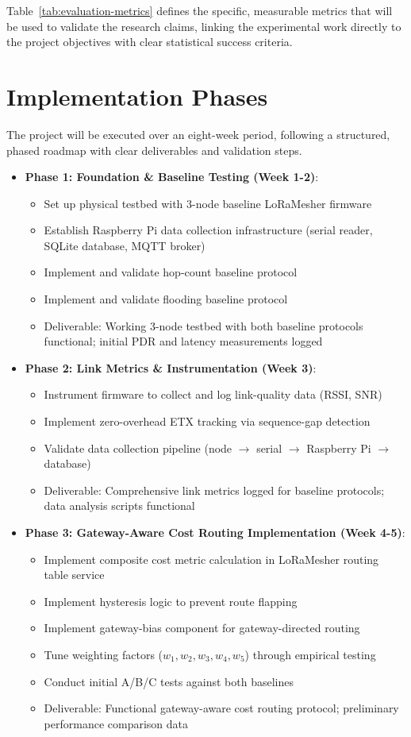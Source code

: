 Table~\ref{tab:evaluation-metrics} defines the specific, measurable metrics that will be used to validate the research claims, linking the experimental work directly to the project objectives with clear statistical success criteria.

\section{Implementation Phases}

The project will be executed over an eight-week period, following a structured, phased roadmap with clear deliverables and validation steps.

\begin{itemize}
\item \textbf{Phase 1: Foundation \& Baseline Testing (Week 1-2)}:
\begin{itemize}
\item Set up physical testbed with 3-node baseline LoRaMesher firmware
\item Establish Raspberry Pi data collection infrastructure (serial reader, SQLite database, MQTT broker)
\item Implement and validate hop-count baseline protocol
\item Implement and validate flooding baseline protocol
\item Deliverable: Working 3-node testbed with both baseline protocols functional; initial PDR and latency measurements logged
\end{itemize}

\item \textbf{Phase 2: Link Metrics \& Instrumentation (Week 3)}:
\begin{itemize}
\item Instrument firmware to collect and log link-quality data (RSSI, SNR)
\item Implement zero-overhead ETX tracking via sequence-gap detection
\item Validate data collection pipeline (node $\rightarrow$ serial $\rightarrow$ Raspberry Pi $\rightarrow$ database)
\item Deliverable: Comprehensive link metrics logged for baseline protocols; data analysis scripts functional
\end{itemize}

\item \textbf{Phase 3: Gateway-Aware Cost Routing Implementation (Week 4-5)}:
\begin{itemize}
\item Implement composite cost metric calculation in LoRaMesher routing table service
\item Implement hysteresis logic to prevent route flapping
\item Implement gateway-bias component for gateway-directed routing
\item Tune weighting factors ($w_1, w_2, w_3, w_4, w_5$) through empirical testing
\item Conduct initial A/B/C tests against both baselines
\item Deliverable: Functional gateway-aware cost routing protocol; preliminary performance comparison data
\end{itemize}


\end{itemize}
